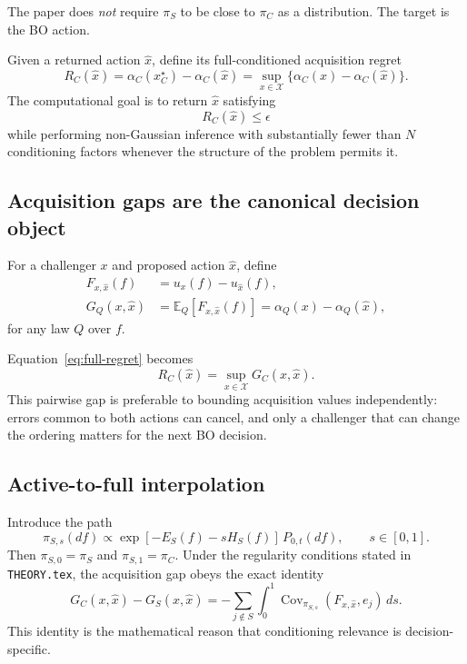 The paper does \emph{not} require $\pi_S$ to be close to $\pi_C$ as a
distribution.  The target is the BO action.

Given a returned action $\widehat x$, define its full-conditioned acquisition
regret
\begin{equation}
    R_C(\widehat x)
    = \alpha_C(x_C^\star)-\alpha_C(\widehat x)
    = \sup_{x\in\mathcal X}
      \bigl\{\alpha_C(x)-\alpha_C(\widehat x)\bigr\}.
    \label{eq:full-regret}
\end{equation}
The computational goal is to return $\widehat x$ satisfying
\begin{equation}
    R_C(\widehat x)\le \epsilon
    \label{eq:target-certificate}
\end{equation}
while performing non-Gaussian inference with substantially fewer than $N$
conditioning factors whenever the structure of the problem permits it.

\subsection{Acquisition gaps are the canonical decision object}

For a challenger $x$ and proposed action $\widehat x$, define
\begin{align}
    F_{x,\widehat x}(f)
    &= u_x(f)-u_{\widehat x}(f), \\
    G_Q(x,\widehat x)
    &= \mathbb E_Q[F_{x,\widehat x}(f)]
     = \alpha_Q(x)-\alpha_Q(\widehat x),
\end{align}
for any law $Q$ over $f$.

Equation~\eqref{eq:full-regret} becomes
\[
    R_C(\widehat x)=\sup_{x\in\mathcal X}G_C(x,\widehat x).
\]
This pairwise gap is preferable to bounding acquisition values independently:
errors common to both actions can cancel, and only a challenger that can change
the ordering matters for the next BO decision.

\subsection{Active-to-full interpolation}

Introduce the path
\begin{equation}
    \pi_{S,s}(df)
    \propto
    \exp[-E_S(f)-sH_S(f)]\,P_{0,t}(df),
    \qquad s\in[0,1].
    \label{eq:interpolation}
\end{equation}
Then $\pi_{S,0}=\pi_S$ and $\pi_{S,1}=\pi_C$.
Under the regularity conditions stated in \texttt{THEORY.tex}, the acquisition
gap obeys the exact identity
\begin{equation}
    G_C(x,\widehat x)-G_S(x,\widehat x)
    =
    -\sum_{j\notin S}
    \int_0^1
    \operatorname{Cov}_{\pi_{S,s}}
    \!\left(F_{x,\widehat x},e_j\right)\,ds.
    \label{eq:gap-transport}
\end{equation}
This identity is the mathematical reason that conditioning relevance is
decision-specific.

